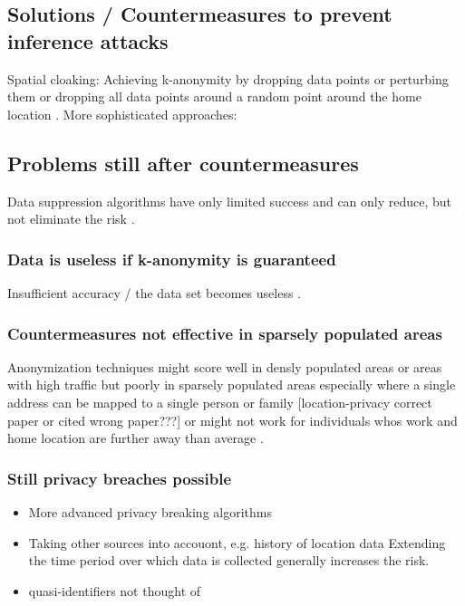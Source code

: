 \subsection{Solutions / Countermeasures to prevent inference attacks}
Spatial cloaking: Achieving k-anonymity by dropping data points or perturbing them or dropping all data points around a random point around the home location \parencite{krumm}.
More sophisticated approaches: \parencite{time-to-confusion}

\subsection{Problems still after countermeasures}
Data suppression algorithms have only limited success and can only reduce, but not eliminate the risk \parencite{hoh2006enhancing}.

\subsubsection{Data is useless if k-anonymity is guaranteed}
Insufficient accuracy / the data set becomes useless \parencite{krumm, cellphone, k-anonymity-old, k-anonymity, k-anonymity-achieving}.

\subsubsection{Countermeasures not effective in sparsely populated areas}
Anonymization techniques might score well in densly populated areas or areas with high traffic but poorly in sparsely populated areas especially where a single address can be mapped to a single person or family \parencite{time-to-confusion, location-privacy, hoh2006enhancing} [location-privacy correct paper or cited wrong paper???] or might not work for individuals whos work and home location are further away than average \parencite{privacy-home-work-pairs}.

\subsubsection{Still privacy breaches possible}
\begin{itemize}
	\item More advanced privacy breaking algorithms
\item Taking other sources into accouont, e.g. history of location data
Extending the time period over which data is collected generally increases the risk.

\item quasi-identifiers not thought of
\end{itemize}
